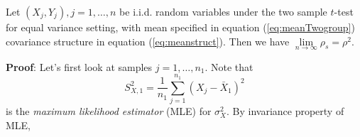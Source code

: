 	\begin{lemma}\label{thm:invScorlimit}
		Let $(X_j, Y_j), j = 1, \ldots, n$ be i.i.d. random variables under the two sample $t$-test 
		for equal variance setting, 
		with mean specified in equation (\ref{eq:meanTwogroup}) covariance structure in equation 
		(\ref{eq:meanstruct}). Then we have
		$\lim\limits_{n\rightarrow\infty}\rho_s = \rho^2$.
	\end{lemma}
	\textbf{Proof}: Let's first look at samples $j=1, \ldots, n_1$. Note that 
	\begin{equation}
	S_{X,1}^2= \frac{1}{n_1}\sum_{j=1}^{n_1}(X_j -\bar{X}_1)^2
	\end{equation}
	is the \textit{maximum likelihood estimator} (MLE) for $\sigma_X^2$. By invariance property of 
	MLE,
